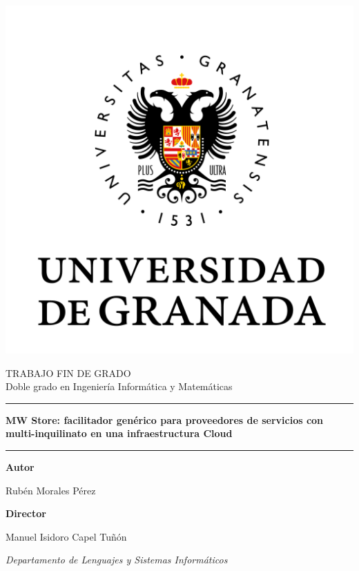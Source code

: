 \documentclass[11pt,spanish]{article} %
\title{  } %
\author{ }
\date{ } %
\begin{document}
\begin{center}
  \includegraphics[scale=0.4]{img/logo_ugr.png}
\end{center}

\begin{center}
  \Large TRABAJO FIN DE GRADO\\ 
  \large Doble grado en Ingeniería Informática y Matemáticas
  \vspace{0.7cm}

  \hrule
  \vspace{0.2cm}
  \textbf{\LARGE MW Store: facilitador genérico para proveedores de servicios con multi-inquilinato en una infraestructura Cloud}
  \vspace{0.2cm}
  \hrule
  \vspace{2cm}
  
  \textbf{Autor}

  Rubén Morales Pérez

  \vspace{2cm}
  \textbf{Director}

  Manuel Isidoro Capel Tuñón

  \textit{Departamento de Lenguajes y Sistemas Informáticos}
\end{center}

\newpage

\ 
\thispagestyle{empty}
\end{document}
